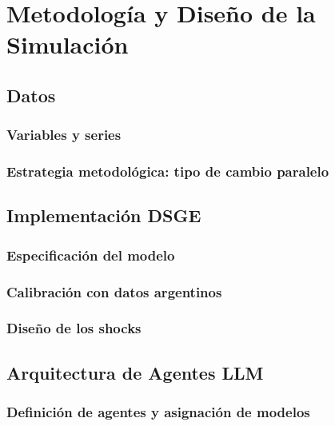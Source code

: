 
\chapter{Metodología y Diseño de la Simulación}
\label{chap:metodologia}

\section{Datos}
\label{sec:datos}

\subsection{Variables y series}
\label{subsec:variables}

\subsection{Estrategia metodológica: tipo de cambio paralelo}
\label{subsec:tc-paralelo}

\section{Implementación DSGE}
\label{sec:implementacion-dsge}

\subsection{Especificación del modelo}
\label{subsec:especificacion}

\subsection{Calibración con datos argentinos}
\label{subsec:calibracion}

\subsection{Diseño de los shocks}
\label{subsec:shocks-dsge}

\section{Arquitectura de Agentes LLM}
\label{sec:arquitectura-agentes}

\subsection{Definición de agentes y asignación de modelos}
\label{subsec:agentes-modelos}

